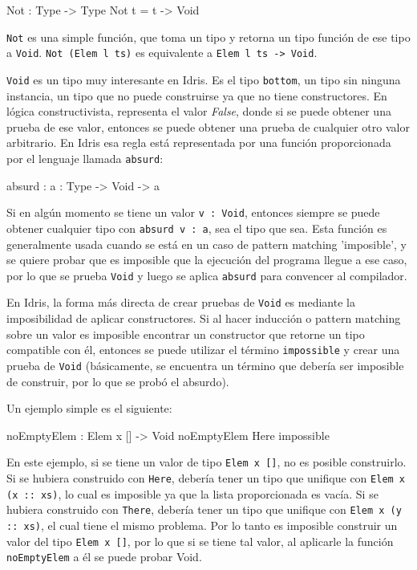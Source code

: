 \begin{code}
Not : Type -> Type
Not t = t -> Void
\end{code}

\texttt{Not} es una simple función, que toma un tipo y retorna un tipo función de ese tipo a \texttt{Void}. \texttt{Not (Elem l ts)} es equivalente a \texttt{Elem l ts -> Void}.

\texttt{Void} es un tipo muy interesante en Idris. Es el tipo \texttt{bottom}, un tipo sin ninguna instancia, un tipo que no puede construirse ya que no tiene constructores. En lógica constructivista, representa el valor \textit{False}, donde si se puede obtener una prueba de ese valor, entonces se puede obtener una prueba de cualquier otro valor arbitrario. En Idris esa regla está representada por una función proporcionada por el lenguaje llamada \texttt{absurd}:

\begin{code}
absurd : {a : Type} -> Void -> a
\end{code}

Si en algún momento se tiene un valor \texttt{v : Void}, entonces siempre se puede obtener cualquier tipo con \texttt{absurd v : a}, sea el tipo que sea. Esta función es generalmente usada cuando se está en un caso de pattern matching 'imposible', y se quiere probar que es imposible que la ejecución del programa llegue a ese caso, por lo que se prueba \texttt{Void} y luego se aplica \texttt{absurd} para convencer al compilador.

En Idris, la forma más directa de crear pruebas de \texttt{Void} es mediante la imposibilidad de aplicar constructores. Si al hacer inducción o pattern matching sobre un valor es imposible encontrar un constructor que retorne un tipo compatible con él, entonces se puede utilizar el término \texttt{impossible} y crear una prueba de \texttt{Void} (básicamente, se encuentra un término que debería ser imposible de construir, por lo que se probó el absurdo).

Un ejemplo simple es el siguiente:

\begin{code}
noEmptyElem : Elem x [] -> Void
noEmptyElem Here impossible
\end{code}

En este ejemplo, si se tiene un valor de tipo \texttt{Elem x []}, no es posible construirlo. Si se hubiera construido con \texttt{Here}, debería tener un tipo que unifique con \texttt{Elem x (x :: xs)}, lo cual es imposible ya que la lista proporcionada es vacía. Si se hubiera construido con \texttt{There}, debería tener un tipo que unifique con \texttt{Elem x (y :: xs)}, el cual tiene el mismo problema. Por lo tanto es imposible construir un valor del tipo \texttt{Elem x []}, por lo que si se tiene tal valor, al aplicarle la función \texttt{noEmptyElem} a él se puede probar Void.

